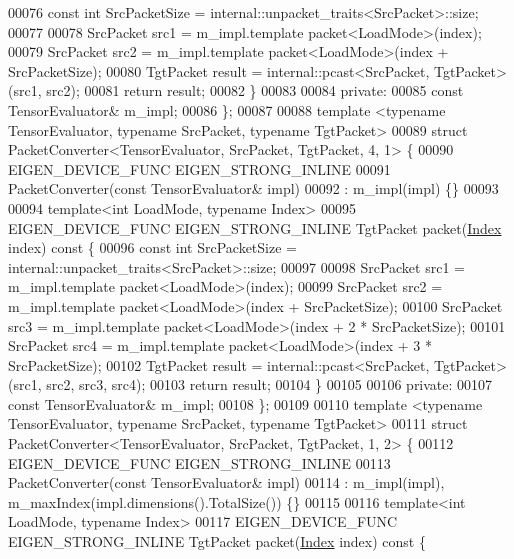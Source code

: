 \begin{DoxyCode}
00076     \textcolor{keyword}{const} \textcolor{keywordtype}{int} SrcPacketSize = internal::unpacket\_traits<SrcPacket>::size;
00077 
00078     SrcPacket src1 = m\_impl.template packet<LoadMode>(index);
00079     SrcPacket src2 = m\_impl.template packet<LoadMode>(index + SrcPacketSize);
00080     TgtPacket result = internal::pcast<SrcPacket, TgtPacket>(src1, src2);
00081     \textcolor{keywordflow}{return} result;
00082   \}
00083 
00084  \textcolor{keyword}{private}:
00085   \textcolor{keyword}{const} TensorEvaluator& m\_impl;
00086 \};
00087 
00088 \textcolor{keyword}{template} <\textcolor{keyword}{typename} TensorEvaluator, \textcolor{keyword}{typename} SrcPacket, \textcolor{keyword}{typename} TgtPacket>
00089 \textcolor{keyword}{struct }PacketConverter<TensorEvaluator, SrcPacket, TgtPacket, 4, 1> \{
00090   EIGEN\_DEVICE\_FUNC EIGEN\_STRONG\_INLINE
00091   PacketConverter(\textcolor{keyword}{const} TensorEvaluator& impl)
00092       : m\_impl(impl) \{\}
00093 
00094   \textcolor{keyword}{template}<\textcolor{keywordtype}{int} LoadMode, \textcolor{keyword}{typename} Index>
00095   EIGEN\_DEVICE\_FUNC EIGEN\_STRONG\_INLINE TgtPacket packet(\hyperlink{namespace_eigen_a62e77e0933482dafde8fe197d9a2cfde}{Index} index)\textcolor{keyword}{ const }\{
00096     \textcolor{keyword}{const} \textcolor{keywordtype}{int} SrcPacketSize = internal::unpacket\_traits<SrcPacket>::size;
00097 
00098     SrcPacket src1 = m\_impl.template packet<LoadMode>(index);
00099     SrcPacket src2 = m\_impl.template packet<LoadMode>(index + SrcPacketSize);
00100     SrcPacket src3 = m\_impl.template packet<LoadMode>(index + 2 * SrcPacketSize);
00101     SrcPacket src4 = m\_impl.template packet<LoadMode>(index + 3 * SrcPacketSize);
00102     TgtPacket result = internal::pcast<SrcPacket, TgtPacket>(src1, src2, src3, src4);
00103     \textcolor{keywordflow}{return} result;
00104   \}
00105 
00106  \textcolor{keyword}{private}:
00107   \textcolor{keyword}{const} TensorEvaluator& m\_impl;
00108 \};
00109 
00110 \textcolor{keyword}{template} <\textcolor{keyword}{typename} TensorEvaluator, \textcolor{keyword}{typename} SrcPacket, \textcolor{keyword}{typename} TgtPacket>
00111 \textcolor{keyword}{struct }PacketConverter<TensorEvaluator, SrcPacket, TgtPacket, 1, 2> \{
00112   EIGEN\_DEVICE\_FUNC EIGEN\_STRONG\_INLINE
00113   PacketConverter(\textcolor{keyword}{const} TensorEvaluator& impl)
00114       : m\_impl(impl), m\_maxIndex(impl.dimensions().TotalSize()) \{\}
00115 
00116   \textcolor{keyword}{template}<\textcolor{keywordtype}{int} LoadMode, \textcolor{keyword}{typename} Index>
00117   EIGEN\_DEVICE\_FUNC EIGEN\_STRONG\_INLINE TgtPacket packet(\hyperlink{namespace_eigen_a62e77e0933482dafde8fe197d9a2cfde}{Index} index)\textcolor{keyword}{ const }\{

\end{DoxyCode}
